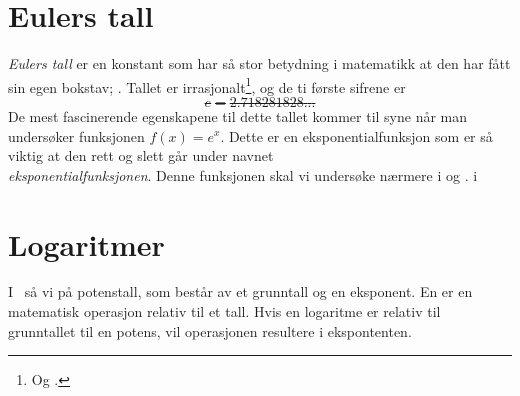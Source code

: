 \newpage
{}
\section{Eulers tall}
\textit{Eulers tall} er en konstant som har så stor betydning i matematikk at den har fått sin egen bokstav; . Tallet er irrasjonalt\footnote{Og .}, og de ti første sifrene er
\st{\[ e=2.718281828... \]}
De mest fascinerende egenskapene til dette tallet kommer til syne når man undersøker funksjonen ${f(x)= e^x} $. Dette er en eksponentialfunksjon som er så viktig at den rett og slett går under navnet \\\textit{eksponentialfunksjonen}. Denne funksjonen skal vi undersøke nærmere i  og .
i 
\section{Logaritmer}
I \mb\, så vi på potenstall, som består av et grunntall og en eksponent. En  er en matematisk operasjon relativ til et tall. Hvis en logaritme er relativ til grunntallet til en potens, vil operasjonen resultere i ekspontenten.\vsk

